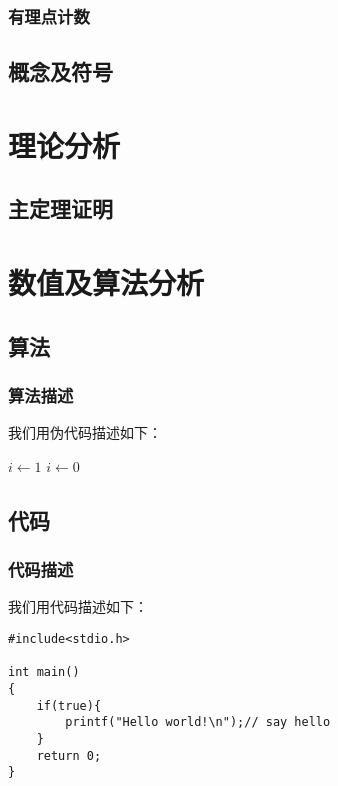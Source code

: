 \documentclass{whuthesis}
\begin{document}
\subsection{有理点计数}
\section{概念及符号}

\chapter{理论分析}
\section{主定理证明}

\chapter{数值及算法分析}

\section{算法}
\subsection{算法描述}
我们用伪代码描述如下：
\begin{algorithm}
\begin{algorithmic}
\STATE $i\gets1$
\ELSE{}
\STATE $i\gets0$
\ENDIF\ENDIF
\end{algorithmic}
\end{algorithm}

\section{代码}
\subsection{代码描述}
我们用代码描述如下：
\begin{lstlisting}[language={[ANSI]C}]
#include<stdio.h>

int main()
{
    if(true){
        printf("Hello world!\n");// say hello
    }
    return 0;
}
\end{lstlisting}

\end{document}
